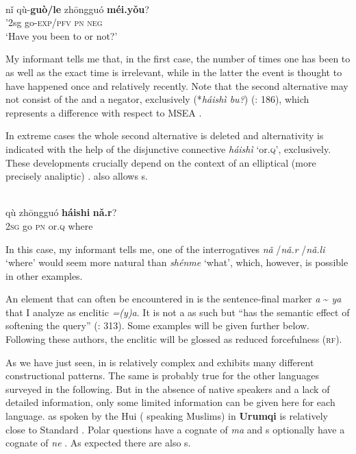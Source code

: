 \ea%
    \label{ex:trans:13}
    \\
    \gll nǐ  qù-\textbf{{guò}}\textbf{{/le}} {zhōngguó} \textbf{{méi}}\textbf{.}\textbf{{yǒu}}?\\
    ’2sg  go-\textsc{exp/pfv}  \textsc{pn} \textsc{neg}\\
    \glt ‘Have you been to  or not?’
    \z

My informant tells me that, in the first case, the number of times one has been to  as well as the exact time is irrelevant, while in the latter the event is thought to have happened once and relatively recently. Note that the second alternative may not consist of the  and a negator, exclusively (*\textit{háishì bu?}) (\citealt{LuoTianhua2013}: 186), which represents a difference with respect to MSEA \citep{Clark1985}.

In extreme cases the whole second alternative is deleted and alternativity is indicated with the help of the disjunctive connective \textit{háishì}  ‘or.\textsc{q}’, exclusively. These developments crucially depend on the context of an elliptical (more precisely analiptic) .  also allows s.

\ea%
    \label{ex:trans:14}
    \\
     {qù} {zhōngguó} \textbf{{háishi}} \textbf{{nǎ.r}}?\\
    2\textsc{sg}  go  \textsc{pn}    or.\textsc{q}  where\\
    \glt
    \z

\noindent In this case, my informant tells me, one of the interrogatives \textit{nǎ} /\textit{nǎ.r} /\textit{nǎ.li}  ‘where’ would seem more natural than \textit{shénme}  ‘what’, which, however, is possible in other examples.

An element that can often be encountered in   is the sentence-final marker \textit{a}  {\textasciitilde} \textit{ya}  that I analyze as enclitic \textit{=(y)a}. It is not a  as such but “has the semantic effect of softening the query” (\citealt{LiThompson1981}: 313). Some examples will be given further below. Following these authors, the enclitic will be glossed as reduced forcefulness (\textsc{rf}).

As we have just seen,  in  is relatively complex and exhibits many different constructional patterns. The same is probably true for the other  languages surveyed in the following. But in the absence of native speakers and a lack of detailed information, only some limited information can be given here for each language.  as spoken by the Hui ( speaking Muslims) in \textbf{Urumqi} is relatively close to Standard . Polar questions have a cognate of \textit{ma}  and s optionally have a cognate of \textit{ne} . As expected there are also s.

